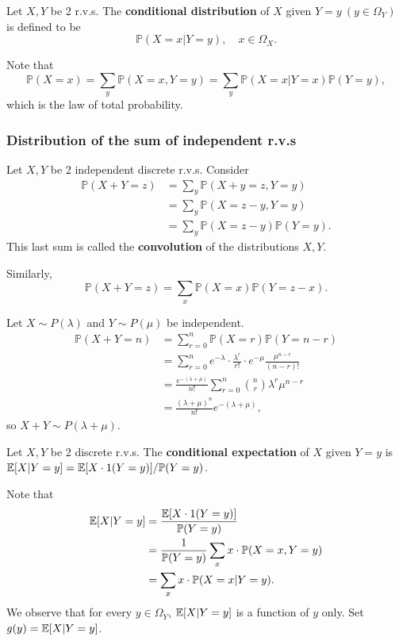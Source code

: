 \begin{definition}
    Let $X,Y$ be 2 r.v.s. The \textbf{conditional distribution} of $X$ given $ Y=y\ (y\in \Omega_Y) $ is defined to be 
    \[
        \mathbb{P}(X=x|Y=y),\quad x\in \Omega_X.
    \]
\end{definition}
Note that 
\[
    \mathbb{P}(X=x) = \sum_{y} \mathbb{P}(X=x,Y=y) = \sum_{y} \mathbb{P}(X=x|Y=x)\mathbb{P}(Y=y),
\]
which is the law of total probability.
\subsubsection*{Distribution of the sum of independent r.v.s}
Let $ X,Y $ be 2 independent discrete r.v.s. Consider 
\begin{align*}
    \mathbb{P}(X+Y=z) &= \sum_{y} \mathbb{P}(X+y=z,Y=y)\\ 
    &= \sum_{y} \mathbb{P}(X=z-y,Y=y)\\ 
    &= \sum_{y} \mathbb{P}(X=z-y)\mathbb{P}(Y=y).
\end{align*}
This last sum is called the \textbf{convolution} of the distributions $X,Y$.

Similarly,
\[
    \mathbb{P}(X+Y=z)=\sum_{x} \mathbb{P}(X=x)\mathbb{P}(Y=z-x).
\]
\begin{example}
    Let $ X \sim P(\lambda) $ and $ Y \sim P(\mu) $ be independent.
    \begin{align*}
        \mathbb{P}(X+Y=n)&= \sum_{r=0}^{n}\mathbb{P}(X=r)\mathbb{P}(Y=n-r)\\ 
        &= \sum_{r=0}^{n}e^{-\lambda}\cdot \frac{\lambda^r}{r!}\cdot e^{-\mu}\frac{\mu^{n-r}}{(n-r)!}\\ 
        &= \frac{e^{-(\lambda+\mu)}}{n!}\sum_{r=0}^{n} \binom{n}{r} \lambda^r \mu^{n-r}\\ 
        &= \frac{(\lambda+\mu)^n}{n!}e^{-(\lambda+\mu)},
    \end{align*}
    so $ X+Y \sim P(\lambda+\mu) $.
\end{example}
\begin{definition}
    Let $ X,Y $ be 2 discrete r.v.s. The \textbf{conditional expectation} of $X$ given $Y=y$ is $ {\mathbb{E}}[X|Y=y]={\mathbb{E}}[X\cdot 1(Y=y)]/\mathbb{P}(Y=y) $.
\end{definition}
Note that 
\begin{align*}
    {\mathbb{E}}[X|Y=y] &= \frac{{\mathbb{E}}[X\cdot 1(Y=y)]}{\mathbb{P}(Y=y)}\\
     &= \frac{1}{\mathbb{P}(Y=y)}\sum_{x} x \cdot \mathbb{P}(X=x,Y=y)
     \\ &= \sum_{x} x \cdot \mathbb{P}(X=x|Y=y).
\end{align*}
We observe that for every $y\in \Omega_Y$, ${\mathbb{E}}[X|Y=y]$ is a function of $y$ only. Set $ g(y)={\mathbb{E}}[X|Y=y] $.

